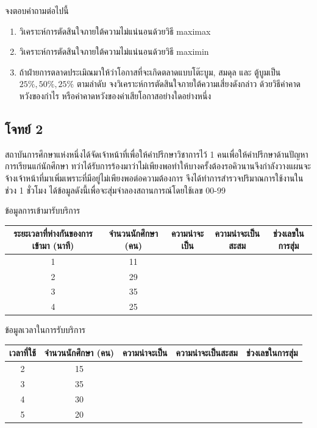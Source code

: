 จงตอบคำถามต่อไปนี้
\begin{enumerate}
    \item วิเคราะห์การตัดสินใจภายใต้ความไม่แน่นอนด้วยวิธี maximax
    \item วิเคราะห์การตัดสินใจภายใต้ความไม่แน่นอนด้วยวิธี maximin
    \item ถ้าฝ่ายการตลาดประเมิณมาให้ว่าโอกาสที่จะเกิดตลาดแบบโต๊ะบูม, สมดุล และ ตู้บูมเป็น $25\%, 50\%, 25\%$ ตามลำดับ จงวิเคราะห์การตัดสินใจภายใต้ความเสี่ยงดังกล่าว ด้วยวิธีค่าคาดหวังของกำไร หรือค่าคาดหวังของค่าเสียโอกาสอย่างใดอย่างหนึ่ง
\end{enumerate}

\subsection*{โจทย์ 2}
สถาบันการศึกษาแห่งหนึ่งได้จัดเจ้าหน้าที่เพื่อให้คำปรึกษาวิชาการไว้ 1 คนเพื่อให้คำปรึกษาด้านปัญหาการเรียนแก่นักศึกษา ทว่าได้รับการร้องมาว่าไม่เพียงพอทำให้บางครั้งต้องรอคิวนานจึงกำลังวางแผนจะจ้างเจ้าหน้าที่มาเพิ่มเพราะที่มีอยู่ไม่เพียงพอต่อความต้องการ จึงได้ทำการสำรวจปริมาณการใช้งานในช่วง 1 ชั่วโมง ได้ข้อมูลดังนี้เพื่อจะสุ่มจำลองสถานการณ์โดยใช้เลข 00-99

ข้อมูลการเข้ามารับบริการ\\
\begin{tabular}{|c|c|c|c|c|}
\hline
\textbf{ระยะเวลาที่ห่างกันของการเข้ามา (นาที)} & \textbf{จำนวนนักศึกษา (คน)} & ความน่าจะเป็น & ความน่าจะเป็นสะสม & ช่วงเลขในการสุ่ม \\
\hline 1 & 11 &&&\\
\hline 2 & 29  &&&\\
\hline 3 & 35  &&&\\
\hline 4 & 25  &&&\\
\hline
\end{tabular}

ข้อมูลเวลาในการรับบริการ\\
\begin{tabular}{|c|c|c|c|c|}
\hline
\textbf{เวลาที่ใช้} & \textbf{จำนวนนักศึกษา (คน)} & ความน่าจะเป็น & ความน่าจะเป็นสะสม & ช่วงเลขในการสุ่ม \\
\hline 2 & 15 &&& \\
\hline 3 & 35 &&& \\
\hline 4 & 30 &&& \\
\hline 5 & 20 &&& \\
\hline
\end{tabular}

